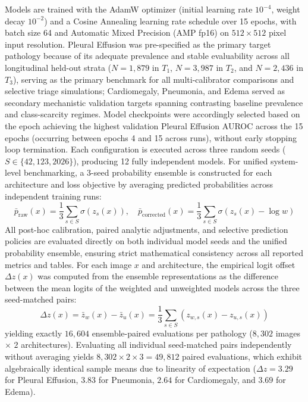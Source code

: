 \documentclass[preprint,12pt]{elsarticle}
\begin{document}
Models are trained with the AdamW optimizer (initial learning rate $10^{-4}$, weight decay $10^{-2}$) and a Cosine Annealing learning rate schedule over 15 epochs, with batch size 64 and Automatic Mixed Precision (AMP fp16) on $512 \times 512$ pixel input resolution. Pleural Effusion was pre-specified as the primary target pathology because of its adequate prevalence and stable evaluability across all longitudinal held-out strata ($N=1,879$ in $T_1$, $N=3,987$ in $T_2$, and $N=2,436$ in $T_3$), serving as the primary benchmark for all multi-calibrator comparisons and selective triage simulations; Cardiomegaly, Pneumonia, and Edema served as secondary mechanistic validation targets spanning contrasting baseline prevalence and class-scarcity regimes. Model checkpoints were accordingly selected based on the epoch achieving the highest validation Pleural Effusion AUROC across the 15 epochs (occurring between epochs 4 and 15 across runs), without early stopping loop termination. Each configuration is executed across three random seeds ($S \in \{42, 123, 2026\}$), producing 12 fully independent models. For unified system-level benchmarking, a 3-seed probability ensemble is constructed for each architecture and loss objective by averaging predicted probabilities across independent training runs:
\begin{equation}
\bar{p}_{\text{raw}}(x) = \frac{1}{3}\sum_{s \in S} \sigma(z_s(x)), \quad \bar{p}_{\text{corrected}}(x) = \frac{1}{3}\sum_{s \in S} \sigma(z_s(x) - \log w)
\end{equation}
All post-hoc calibration, paired analytic adjustments, and selective prediction policies are evaluated directly on both individual model seeds and the unified probability ensemble, ensuring strict mathematical consistency across all reported metrics and tables. For each image $x$ and architecture, the empirical logit offset $\Delta z(x)$ was computed from the ensemble representations as the difference between the mean logits of the weighted and unweighted models across the three seed-matched pairs:
\begin{equation}
\Delta z(x) = \bar{z}_w(x) - \bar{z}_u(x) = \frac{1}{3}\sum_{s \in S} \left( z_{w, s}(x) - z_{u, s}(x) \right)
\label{eq:delta_z_definition}
\end{equation}
yielding exactly $16,604$ ensemble-paired evaluations per pathology ($8,302$ images $\times$ $2$ architectures). Evaluating all individual seed-matched pairs independently without averaging yields $8,302 \times 2 \times 3 = 49,812$ paired evaluations, which exhibit algebraically identical sample means due to linearity of expectation ($\Delta z = 3.29$ for Pleural Effusion, $3.83$ for Pneumonia, $2.64$ for Cardiomegaly, and $3.69$ for Edema).
\end{document}
